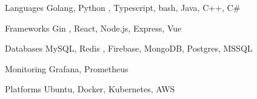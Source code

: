 

\begin{cvskills}

  \cvskill
    {Languages} %
    {Golang, Python} %
    {, Typescript, bash, Java, C++, C\#} %

  \cvskill
    {Frameworks} %
    {Gin} %
    {, React, Node.js, Express, Vue} %

  \cvskill
    {Databases} %
    {MySQL, Redis} %
    {, Firebase, MongoDB, Postgres, MSSQL} %

  \cvskill
    {Monitoring} %
    {} %
    {Grafana, Prometheus} %

  \cvskill
    {Platforms} %
    {} %
    {Ubuntu, Docker, Kubernetes, AWS} %

\end{cvskills}
